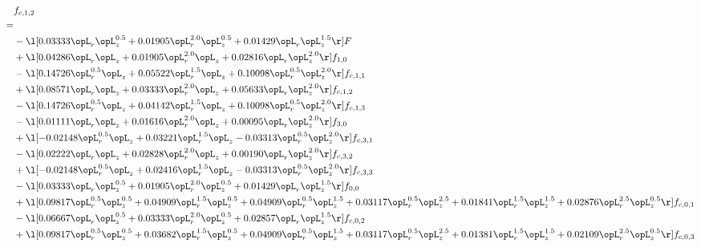 \begin{alignat}{2} 
\label{eq:f_12_1} 
& f_{c,1,2} \nonumber \\ 
 = \\ 
& - \l[  0.03333 \opL_r \opL_z^{0.5} +  0.01905 \opL_r^{2.0} \opL_z^{0.5} +  0.01429 \opL_r \opL_z^{1.5}  \r] F \nonumber \\ 
& + \l[  0.04286 \opL_r \opL_z +  0.01905 \opL_r^{2.0} \opL_z +  0.02816 \opL_r \opL_z^{2.0}  \r] f_{1,0} \nonumber \\ 
& - \l[  0.14726 \opL_r^{0.5} \opL_z +  0.05522 \opL_r^{1.5} \opL_z +  0.10098 \opL_r^{0.5} \opL_z^{2.0}  \r] f_{c,1,1} \nonumber \\ 
& + \l[  0.08571 \opL_r \opL_z +  0.03333 \opL_r^{2.0} \opL_z +  0.05633 \opL_r \opL_z^{2.0}  \r] f_{c,1,2} \nonumber \\ 
& - \l[  0.14726 \opL_r^{0.5} \opL_z +  0.04142 \opL_r^{1.5} \opL_z +  0.10098 \opL_r^{0.5} \opL_z^{2.0}  \r] f_{c,1,3} \nonumber \\ 
& - \l[  0.01111 \opL_r \opL_z +  0.01616 \opL_r^{2.0} \opL_z +  0.00095 \opL_r \opL_z^{2.0}  \r] f_{3,0} \nonumber \\ 
& + \l[  -0.02148 \opL_r^{0.5} \opL_z +  0.03221 \opL_r^{1.5} \opL_z   -0.03313 \opL_r^{0.5} \opL_z^{2.0}  \r] f_{c,3,1} \nonumber \\ 
& - \l[  0.02222 \opL_r \opL_z +  0.02828 \opL_r^{2.0} \opL_z +  0.00190 \opL_r \opL_z^{2.0}  \r] f_{c,3,2} \nonumber \\ 
& + \l[  -0.02148 \opL_r^{0.5} \opL_z +  0.02416 \opL_r^{1.5} \opL_z   -0.03313 \opL_r^{0.5} \opL_z^{2.0}  \r] f_{c,3,3} \nonumber \\ 
& - \l[  0.03333 \opL_r \opL_z^{0.5} +  0.01905 \opL_r^{2.0} \opL_z^{0.5} +  0.01429 \opL_r \opL_z^{1.5}  \r] f_{0,0} \nonumber \\ 
& + \l[  0.09817 \opL_r^{0.5} \opL_z^{0.5} +  0.04909 \opL_r^{1.5} \opL_z^{0.5} +  0.04909 \opL_r^{0.5} \opL_z^{1.5} +  0.03117 \opL_r^{0.5} \opL_z^{2.5} +  0.01841 \opL_r^{1.5} \opL_z^{1.5} +  0.02876 \opL_r^{2.5} \opL_z^{0.5}  \r] f_{c,0,1} \nonumber \\ 
& - \l[  0.06667 \opL_r \opL_z^{0.5} +  0.03333 \opL_r^{2.0} \opL_z^{0.5} +  0.02857 \opL_r \opL_z^{1.5}  \r] f_{c,0,2} \nonumber \\ 
& + \l[  0.09817 \opL_r^{0.5} \opL_z^{0.5} +  0.03682 \opL_r^{1.5} \opL_z^{0.5} +  0.04909 \opL_r^{0.5} \opL_z^{1.5} +  0.03117 \opL_r^{0.5} \opL_z^{2.5} +  0.01381 \opL_r^{1.5} \opL_z^{1.5} +  0.02109 \opL_r^{2.5} \opL_z^{0.5}  \r] f_{c,0,3} \nonumber \\ 

\end{alignat}
